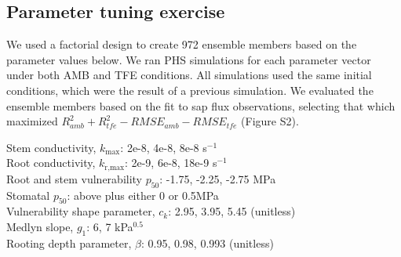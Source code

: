 \documentclass[draft,linenumbers]{agujournal}
\begin{document}
\subsection{Parameter tuning exercise}
\label{ens}

We used a factorial design to create 972 ensemble members based on the parameter values below.
We ran PHS simulations for each parameter vector under both AMB and TFE conditions.
All simulations used the same initial conditions, which were the result of a previous simulation.
We evaluated the ensemble members based on the fit to sap flux observations, selecting that which
 maximized $R^2_{amb}+R^2_{tfe}-RMSE_{amb}-RMSE_{tfe}$ (Figure S2).

Stem conductivity, $k_{\text{max}}$: 2e-8, 4e-8, 8e-8 s$^{-1}$ \\
Root conductivity, $k_{\text{r,max}}$: 2e-9, 6e-8, 18e-9 s$^{-1}$ \\
Root and stem vulnerability $p_{50}$: -1.75, -2.25, -2.75 MPa \\
Stomatal $p_{50}$: above plus either 0 or 0.5MPa \\
Vulnerability shape parameter, $c_k$: 2.95, 3.95, 5.45 (unitless) \\
Medlyn slope, $g_1$: 6, 7 kPa$^{0.5}$ \\
Rooting depth parameter, $\beta$: 0.95, 0.98, 0.993 (unitless) 




\end{document}
